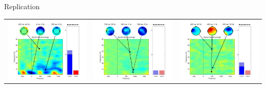 \documentclass[final]{beamer}
\begin{document}
\begin{frame}{}
\begin{textblock}{70}
\begin{block}{Replication}
\begin{tabular}{c c c}
\includegraphics{gamma04} & \includegraphics{gamma05} & \includegraphics{gamma06} \\

\end{tabular}
\end{block}
\end{textblock}
\end{frame}
\end{document}
